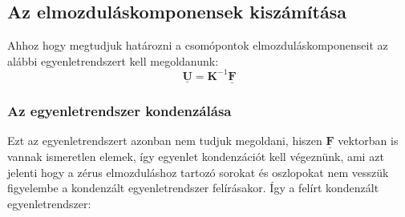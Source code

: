 \documentclass[12pt,a4paper]{article}
\def\mx#1{\mathbf{#1}}
\def\vec#1{\underline{\mathbf{#1}}}
\begin{document}
\subsection{Az elmozduláskomponensek kiszámítása}
Ahhoz hogy megtudjuk határozni a csomópontok elmozduláskomponenseit az alábbi
egyenletrendszert kell megoldanunk:
\begin{equation}
    \boxed{
        \vec{U}=\mx{K}^{-1} \vec{F}}
\end{equation}
\subsubsection{Az egyenletrendszer kondenzálása}
Ezt az egyenletrendszert azonban nem tudjuk megoldani, hiszen $\mx{\vec{F}}$
vektorban is vannak ismeretlen elemek, így egyenlet kondenzációt kell végeznünk,
ami azt jelenti hogy a zérus elmozduláshoz tartozó sorokat és oszlopokat nem vesszük figyelembe
a kondenzált egyenletrendszer felírásakor. Így a felírt
kondenzált egyenletrendszer:
\end{document}
